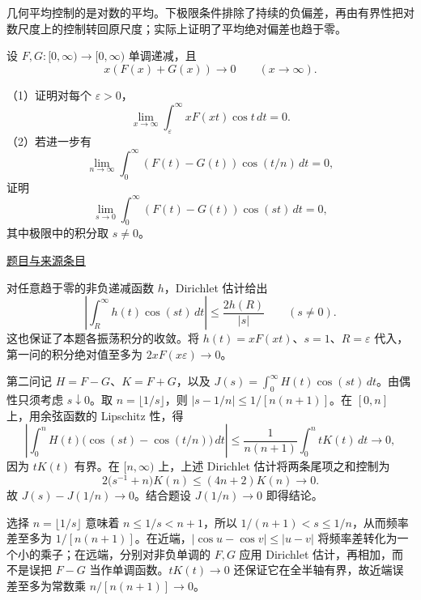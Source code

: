 \documentclass[UTF8,12pt,a4paper,fontset=fandol]{ctexart}
\begin{document}
\begin{remark}[方法与条件]几何平均控制的是对数的平均。下极限条件排除了持续的负偏差，再由有界性把对数尺度上的控制转回原尺度；实际上证明了平均绝对偏差也趋于零。\end{remark}

\begin{example}[来源序号7]\label{ex:fin03-all:7}\label{pr:fin03-all:7}

设 $F,G:[0,\infty)\to[0,\infty)$ 单调递减，且
\[
x(F(x)+G(x))\longrightarrow0\qquad(x\to\infty).
\]

（1）证明对每个 $\varepsilon>0$，
\[
\lim_{x\to\infty}\int_\varepsilon^\infty xF(xt)\cos t\,dt=0.
\]
（2）若进一步有
\[
\lim_{n\to\infty}\int_0^\infty(F(t)-G(t))\cos(t/n)\,dt=0,
\]
证明
\[
\lim_{s\to0}\int_0^\infty(F(t)-G(t))\cos(st)\,dt=0,
\]
其中极限中的积分取 $s\ne0$。

\par\href{https://github.com/lzxcr/cmc-mathematics/blob/64916fa1fdbc3e444a652eca204d5669058ee321/src/problems/finals/03/07.md}{题目与来源条目}

\end{example}

\begin{solve}\label{ans:fin03-all:7}

对任意趋于零的非负递减函数 $h$，Dirichlet 估计给出
\[
\left|\int_R^\infty h(t)\cos(st)\,dt\right|
\le\frac{2h(R)}{|s|}\qquad(s\ne0).
\]
这也保证了本题各振荡积分的收敛。将 $h(t)=xF(xt)$、$s=1$、$R=\varepsilon$ 代入，第一问的积分绝对值至多为
$2xF(x\varepsilon)\to0$。

第二问记 $H=F-G$、$K=F+G$，以及
$J(s)=\int_0^\infty H(t)\cos(st)\,dt$。由偶性只须考虑 $s\downarrow0$。取 $n=\lfloor1/s\rfloor$，则
$|s-1/n|\le1/[n(n+1)]$。在 $[0,n]$ 上，用余弦函数的 Lipschitz 性，得
\[
\left|\int_0^nH(t)\bigl(\cos(st)-\cos(t/n)\bigr)\,dt\right|
\le\frac1{n(n+1)}\int_0^n tK(t)\,dt\longrightarrow0,
\]
因为 $tK(t)$ 有界。在 $[n,\infty)$ 上，上述 Dirichlet 估计将两条尾项之和控制为
\[
2\bigl(s^{-1}+n\bigr)K(n)\le(4n+2)K(n)\longrightarrow0.
\]
故 $J(s)-J(1/n)\to0$。结合题设 $J(1/n)\to0$ 即得结论。

选择 $n=\lfloor1/s\rfloor$ 意味着 $n\le1/s<n+1$，所以 $1/(n+1)<s\le1/n$，从而频率差至多为 $1/[n(n+1)]$。在近端，$|\cos u-\cos v|\le|u-v|$ 将频率差转化为一个小的乘子；在远端，分别对非负单调的 $F,G$ 应用 Dirichlet 估计，再相加，而不是误把 $F-G$ 当作单调函数。$tK(t)\to0$ 还保证它在全半轴有界，故近端误差至多为常数乘 $n/[n(n+1)]\to0$。

\end{solve}
\end{document}
